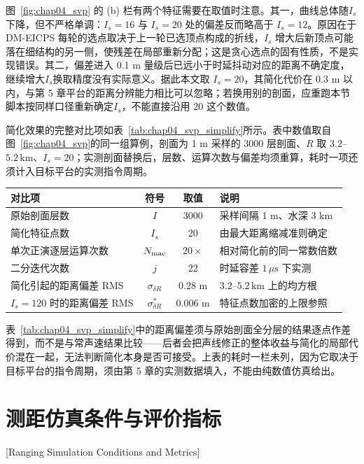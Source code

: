 图~\ref{fig:chap04_svp} 的 (b) 栏有两个特征需要在取值时注意。其一，曲线总体随$I_s$下降，但不严格单调：$I_s=16$ 与 $I_s=20$ 处的偏差反而略高于 $I_s=12$。原因在于 DM-EICPS 每轮的选点取决于上一轮已选顶点构成的折线，$I_s$ 增大后新顶点可能落在细结构的另一侧，使残差在局部重新分配；这是贪心选点的固有性质，不是实现错误。其二，偏差进入 0.1 m 量级后已远小于时延抖动对应的距离不确定度，继续增大$I_s$换取精度没有实际意义。据此本文取 $I_s=20$，其简化代价在 0.3 m 以内，与第 5 章平台的距离分辨能力相比可以忽略；若换用别的剖面，应重跑本节脚本按同样口径重新确定$I_s$，不能直接沿用 20 这个数值。

简化效果的完整对比项如表~\ref{tab:chap04_svp_simplify}所示。表中数值取自图~\ref{fig:chap04_svp}的同一组算例，剖面为 1 m 采样的 3000 层剖面、$R$ 取 $3.2$--$5.2\,\mathrm{km}$、$I_s=20$；实测剖面替换后，层数、运算次数与偏差均须重算，耗时一项还须计入目标平台的实测指令周期。

\begin{table}[htbp]
 \vspace{0.5em}\centering\wuhao
 \begin{tabularx}{\linewidth}{@{}l c c X@{}}
 \toprule[1.5pt]
 对比项 & 符号 & 取值 & 说明\\
 \midrule[1pt]
 原始剖面层数 & $I$ & 3000 & 采样间隔 1 m、水深 3 km\\
 简化特征点数 & $I_s$ & 20 & 由最大距离缩减准则确定\\
 单次正演逐层运算次数 & $N_{\rm mac}$ & $20\times$ & 相对简化前的同一常数倍数\\
 二分迭代次数 & $j$ & 22 & 时延容差 $1\,\mu\mathrm{s}$ 下实测\\
 简化引起的距离偏差 RMS & $\sigma_{\delta R}$ & 0.28 m & $3.2$--$5.2\,\mathrm{km}$ 上的均方根\\
 $I_s=120$ 时的距离偏差 RMS & $\sigma_{\delta R}^{*}$ & 0.006 m & 特征点数加密的上限参照\\
 \bottomrule[1.5pt]
 \end{tabularx}
\end{table}

表~\ref{tab:chap04_svp_simplify}中的距离偏差须与原始剖面全分层的结果逐点作差得到，而不是与常声速结果比较——后者会把声线修正的整体收益与简化的局部代价混在一起，无法判断简化本身是否可接受。上表的耗时一栏未列，因为它取决于目标平台的指令周期，须由第 5 章的实测数据填入，不能由纯数值仿真给出。

\section{测距仿真条件与评价指标}[Ranging Simulation Conditions and Metrics]
\label{sec:chap04_sim}

